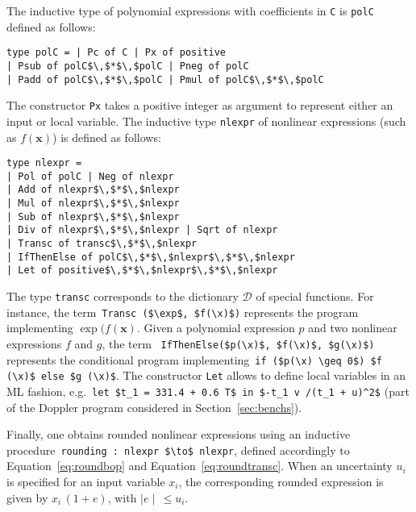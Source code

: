 \documentclass[preprint]{sigplanconf}
\newcommand{\code}[1]{\lstinline{#1}}
\newcommand{\setD}{\mathcal{D}} %
\newcommand{\x}{\mathbf{x}}
\theoremstyle{plain}
\begin{document}
The inductive type of polynomial expressions with coefficients in \code{C} is \code{polC} defined as follows:
\begin{lstlisting}
type polC = | Pc of C | Px of positive 
| Psub of polC$\,$*$\,$polC | Pneg of polC 
| Padd of polC$\,$*$\,$polC | Pmul of polC$\,$*$\,$polC
\end{lstlisting}
%
The constructor \code{Px} takes a positive integer as argument to represent either an input or local variable.
The inductive type \code{nlexpr} of nonlinear expressions (such as $f(\x)$) is defined as follows:
\begin{lstlisting}
type nlexpr = 
| Pol of polC | Neg of nlexpr
| Add of nlexpr$\,$*$\,$nlexpr 
| Mul of nlexpr$\,$*$\,$nlexpr 
| Sub of nlexpr$\,$*$\,$nlexpr 
| Div of nlexpr$\,$*$\,$nlexpr | Sqrt of nlexpr 
| Transc of transc$\,$*$\,$nlexpr
| IfThenElse of polC$\,$*$\,$nlexpr$\,$*$\,$nlexpr
| Let of positive$\,$*$\,$nlexpr$\,$*$\,$nlexpr
\end{lstlisting}
%
The type \code{transc} corresponds to the dictionary $\setD$ of special functions. For instance, the term~\lstinline|Transc ($\exp$, $f(\x)$)| represents the program implementing $\exp(f(\x)$.
Given a polynomial expression $p$ and two nonlinear expressions $f$ and $g$, the term ~\lstinline|IfThenElse($p(\x)$, $f(\x)$, $g(\x)$)| represents the conditional program implementing~\lstinline|if ($p(\x) \geq 0$) $f (\x)$ else $g (\x)$|. The constructor \code{Let} allows to define local variables in an ML fashion, e.g.~\lstinline|let $t_1 = 331.4 + 0.6 T$ in $-t_1 v /(t_1 + u)^2$| (part of the Doppler program considered in Section~\ref{sec:benchs}).
%
%

Finally, one obtains rounded nonlinear expressions using an inductive procedure~\lstinline|rounding : nlexpr $\to$ nlexpr|, defined accordingly to Equation~\eqref{eq:roundbop} and Equation~\eqref{eq:roundtransc}. When an uncertainty $u_i$ is specified for an input variable $x_i$, the corresponding rounded expression is given by $x_i \, (1 + e)$, with $\mid e \mid \, \leq u_i$.

\end{document}
